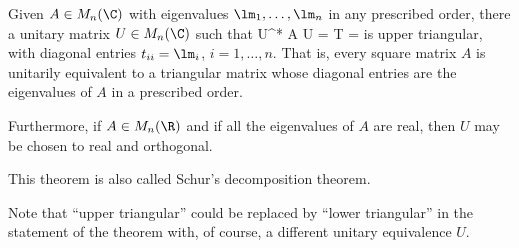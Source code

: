 \begin{theorem}\label{thm:schur_unitary_triangularization}
Given $A\in M_n(\C)$ with eigenvalues $\lm_1,\dots,\lm_n$ in any prescribed order, there a unitary matrix $U\in M_n(\C)$ such that
\be
U^* A U = T = 
\ee
is upper triangular, with diagonal entries $t_{ii} = \lm_i$, $i=1,\dots,n$. That is, every square matrix $A$ is unitarily equivalent to a triangular matrix whose diagonal entries are the eigenvalues
of $A$ in a prescribed order.

Furthermore, if $A\in M_n(\R)$ and if all the eigenvalues of $A$ are real, then $U$ may be chosen to real and orthogonal.
\end{theorem}

\begin{remark}
This theorem is also called Schur's decomposition theorem.

Note that ``upper triangular'' could be replaced by ``lower triangular'' in the statement of the theorem with, of course, a different unitary equivalence $U$.
\end{remark}

